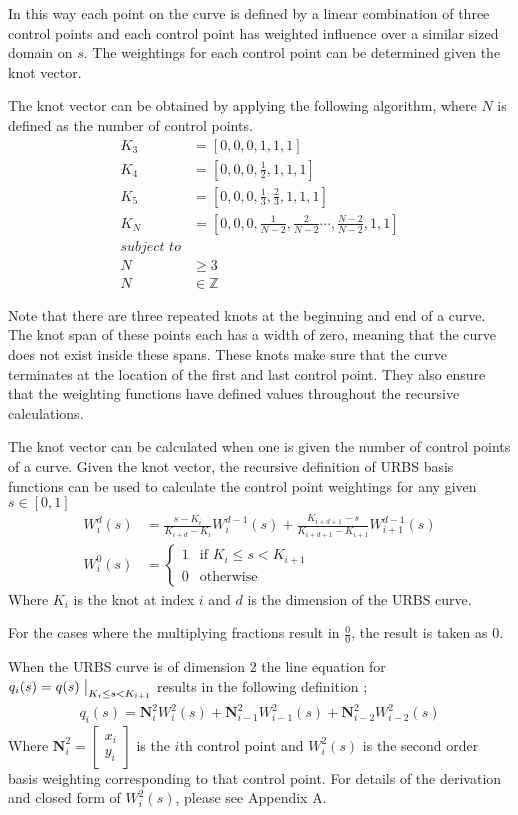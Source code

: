 In this way each point on the curve is defined by a linear combination of three control points and each control point has weighted influence over a similar sized domain on $s$. The weightings for each control point can be determined given the knot vector.

The knot vector can be obtained by applying the following algorithm, where $N$ is defined as the number of control points.
\begin{align*}
K_3 &= \left[0, 0, 0, 1, 1, 1\right]\\  
K_4 &= \left[0, 0, 0, \frac{1}{2}, 1, 1, 1\right]\\  
K_5 &= \left[0, 0, 0, \frac{1}{3}, \frac{2}{3}, 1, 1, 1\right]\\
K_N &= \left[0, 0, 0, \frac{1}{N-2},\frac{2}{N-2} \cdots ,\frac{N-2}{N-2}, 1, 1\right]\\  
\textit{subject to}\\
N &\geq 3\\
N &\in \mathbb{Z}
\end{align*}

Note that there are three repeated knots at the beginning and end of a curve. The knot span of these points each has a width of zero, meaning that the curve does not exist inside these spans. These knots make sure that the curve terminates at the location of the first and last control point. They also ensure that the weighting functions have defined values throughout the recursive calculations.

The knot vector can be calculated when one is given the number of control points of a curve. Given the knot vector, the recursive definition of URBS basis functions can be used to calculate the control point weightings for any given $s \in [0, 1]$
\begin{align*}
W_{i}^d(s) &=   \frac{s - K_i}{K_{i+d} - K_i}W_{i}^{d-1}(s)  +  \frac{K_{i + d + 1} - s}{K_{i + d + 1} - K_{i+1}}W_{i+1}^{d-1}(s)\\
W_{i}^0(s) &= \begin{cases}
   1 & \text{if } K_i \leq s < K_{i+1} \\
   0 & \text{otherwise}
  \end{cases}
\end{align*}
Where $K_i$ is the knot at index $i$ and $d$ is the dimension of the URBS curve.

For the cases where the multiplying fractions result in $\frac{0}{0}$, the result is taken as $0$.

When the URBS curve is of dimension 2 the line equation for $q_i(s) = q(s)\bigm|_{K_i \leq s < K_{i+1}}$ results in the following definition \cite{website:nurbsExplain};
\begin{align*}
q_i(s) = \textbf{N}_i^2W_{i}^{2}(s) + \textbf{N}_{i-1}^2W_{i-1}^{2}(s) + \textbf{N}_{i-2}^2W_{i-2}^{2}(s)
\end{align*}
Where $\textbf{N}_i^2 = \begin{bmatrix}
x_i\\y_i
\end{bmatrix}$ is the $i$th control point and $W_{i}^{2}(s)$ is the second order basis weighting corresponding to that control point. 
For details of the derivation and closed form of $W_{i}^{2}(s)$, please see Appendix A.

